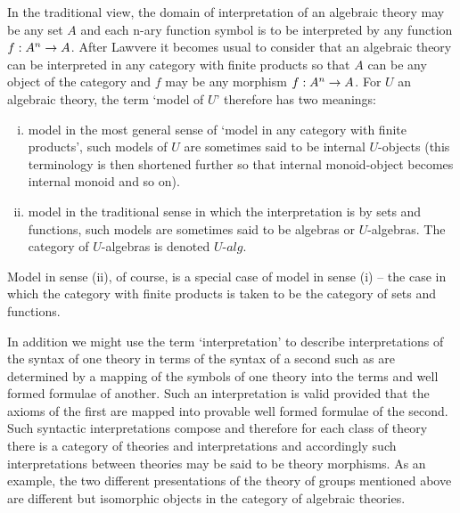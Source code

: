 \note
In the traditional view, the domain of interpretation of an algebraic theory may be any set $A$ 
and each n-ary function symbol is to be interpreted by any  function $f:A^n \rightarrow A$.
After Lawvere it becomes usual to consider that an algebraic theory can be interpreted in any category with finite products
 so that $A$ can be any object of the category and  $f$ may be any morphism $f:A^n \rightarrow A$. 
For $U$ an algebraic theory, the term `model of $U$' therefore has two meanings:
\begin{enumerate}[(i)]
\item model in the most general sense of `model in any category  with finite products',
 such models of $U$ are sometimes said to be internal $U$-objects (this terminology is then shortened further so that internal monoid-object becomes internal monoid and so on). 
\item model in the traditional sense in which the interpretation is by sets and functions, such models are sometimes said to be algebras or
$U$-algebras. The category of $U$-algebras is denoted $U$-$alg$. 
\end{enumerate} 
Model in sense (ii), of course, is a special case of model in sense (i) --  the case in which the category with finite products is taken to be the category of sets and functions.

\note In addition we might use the term `interpretation' to describe interpretations of the syntax of one theory in terms of the syntax of a second
such as are determined by a mapping of the symbols of one theory into the terms and well formed formulae of another. 
Such an interpretation is valid provided that the axioms of the first are mapped into provable well formed formulae of the second.  Such syntactic interpretations compose and therefore for each class of theory there is a category of theories and interpretations and accordingly such 
interpretations between theories may be said to be theory morphisms.
As an example, the two different presentations of the theory of groups mentioned above are different but isomorphic objects in the category of algebraic theories. 

